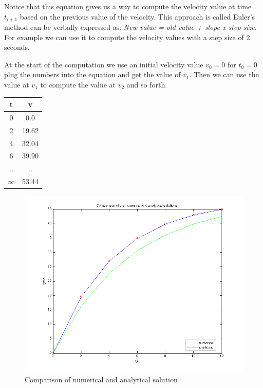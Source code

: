 \documentclass [titlepage,12pt,letter] {article}
\begin{document}
Notice that this equation gives us a way to compute the velocity value
at time $t_{i+1}$ based on the previous value of the velocity. This
approach is called Euler's method can be verbally expressed as: 
{\it New value = old value + slope x step size}. For example we can
use it to compute the velocity values with a step size of $2$
seconds. 

At the start of the computation we use an initial velocity value
$v_{0} = 0$ for $t_{0} = 0$ plug the numbers into the equation 
and get the value of $v_{1}$. Then we can use the value at $v_{1}$ to 
compute the value at $v_{2}$ and so forth. 


\begin{table} 
\centering
\begin{tabular}{|c|c|} 
\hline
{\bf t}    & {\bf v} \\ 
\hline 
0   &  0.0 \\ 
2   &  19.62 \\ 
4   &  32.04 \\ 
6   &  39.90  \\
..   &  ..  \\
$\infty$ & 53.44 \\ 
\hline
\end{tabular}
\end{table} 


\begin{figure}[ht]
  \centering
  \includegraphics[scale=0.5]{comparison_numerical_analytical}
  \caption{Comparison of numerical and analytical solution}
  \label{fig:comparison}
\end{figure}
\end{document}
